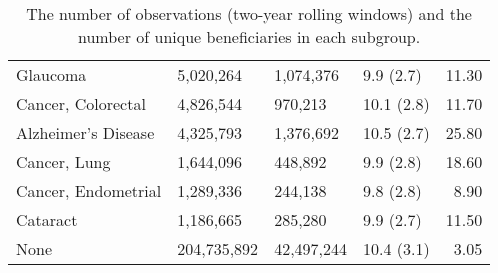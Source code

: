 \begin{table}[ht]
\begin{tabular}{llllr}
  Glaucoma & 5,020,264 & 1,074,376 & 9.9 (2.7) & 11.30 \\ 
  Cancer, Colorectal & 4,826,544 & 970,213 & 10.1 (2.8) & 11.70 \\ 
  Alzheimer's Disease & 4,325,793 & 1,376,692 & 10.5 (2.7) & 25.80 \\ 
  Cancer, Lung & 1,644,096 & 448,892 & 9.9 (2.8) & 18.60 \\ 
  Cancer, Endometrial & 1,289,336 & 244,138 & 9.8 (2.8) & 8.90 \\ 
  Cataract & 1,186,665 & 285,280 & 9.9 (2.7) & 11.50 \\ 
  None & 204,735,892 & 42,497,244 & 10.4 (3.1) & 3.05 \\ 
   \hline
\end{tabular}
\caption{The number of observations (two-year rolling windows) and the number
             of unique beneficiaries in each subgroup.} 
\label{tab:subgroup_n}
\end{table}
